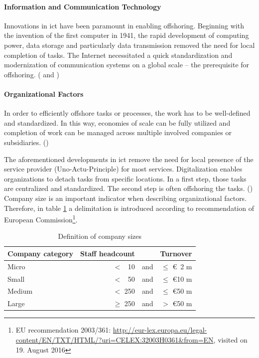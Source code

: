 \paragraph{Information and Communication Technology}
Innovations in \gls{ict} have been paramount in enabling offshoring. Beginning with the invention of the first computer in 1941, the rapid development of computing power, data storage and particularly data transmission removed the need for local completion of tasks. The Internet necessitated a quick standardization and modernization of communication systems on a global scale -- the prerequisite for offshoring. (\cite[pp. 9f]{Hutzschenreuter.2007} and \cite[p. 93]{Jahns.2007})

\paragraph{Organizational Factors}
In order to efficiently offshore tasks or processes, the work has to be well-defined and standardized. In this way, economies of scale can be fully utilized and completion of work can be managed across multiple involved companies or subsidiaries. (\cite[p. 11]{Hutzschenreuter.2007})

The aforementioned developments in \gls{ict} remove the need for local presence of the service provider (Uno-Actu-Principle) for most services. Digitalization enables organizations to detach tasks from specific locations. In a first step, those tasks are centralized and standardized. The second step is often offshoring the tasks. (\cite[pp. 12f]{Hutzschenreuter.2007})
\newpage
Company size is an important indicator when describing organizational factors. Therefore, in table \ref{tab:CompanySize} a delimitation is introduced according to recommendation of European Commission\footnote{EU recommendation 2003/361: \url{http://eur-lex.europa.eu/legal-content/EN/TXT/HTML/?uri=CELEX:32003H0361&from=EN}, visited on 19. August 2016}.
\vspace{3mm}
\begin{table}[htb!]
	\centering
	\begin{tabular}{l | r c r}
		\textbf{Company category} & \textbf{Staff headcount} && \textbf{Turnover}\\ \hline
		\rule{0pt}{3ex}   Micro & $<$ \, 10 &  and & $\le$ \euro \, 2 m\\ \hline
		\rule{0pt}{3ex}   Small & $<$ \, 50 & and & $\le$ \euro 10 m\\ \hline
		\rule{0pt}{3ex}   Medium & $<$ 250 & and & $\le$ \euro 50 m\\ \hline
		\rule{0pt}{3ex}   Large & $\ge$ 250 & and & $>$ \euro 50 m\\
	\end{tabular}
	\vspace{3mm}
	\caption{Definition of company sizes}
	\label{tab:CompanySize}
\end{table}

